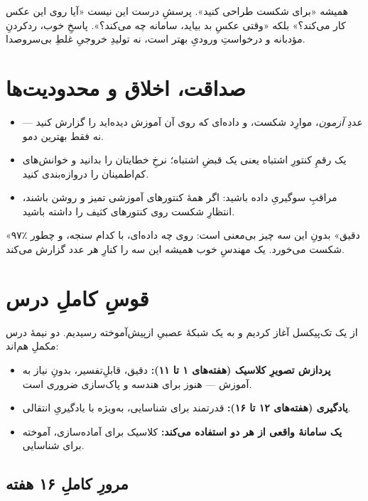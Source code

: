 \documentclass[12pt,a4paper]{article}
\begin{document}
\begin{hoshdar}
همیشه «برای شکست طراحی کنید». پرسشِ درست این نیست «آیا روی این عکس کار می‌کند؟» بلکه «وقتی عکسِ بد بیاید، سامانه چه می‌کند؟». پاسخِ خوب، رد‌کردنِ مؤدبانه و درخواستِ ورودیِ بهتر است، نه تولیدِ خروجیِ غلطِ بی‌سر‌و‌صدا.
\end{hoshdar}

\section{صداقت، اخلاق و محدودیت‌ها}

\begin{itemize}
  \item عددِ \emph{آزمون}، موارِد شکست، و داده‌ای که روی آن آموزش دیده‌اید را گزارش کنید — نه فقط بهترین دمو.
  \item یک رقمِ کنتورِ اشتباه یعنی یک قبضِ اشتباه؛ نرخِ خطایتان را بدانید و خوانش‌های کم‌اطمینان را دروازه‌بندی کنید.
  \item مراقبِ سوگیریِ داده باشید: اگر همهٔ کنتورهای آموزشی تمیز و روشن باشند، انتظارِ شکست روی کنتورهای کثیف را داشته باشید.
\end{itemize}

\begin{nokte}
«۹۷٪ دقیق» بدونِ این سه چیز بی‌معنی است: روی چه داده‌ای، با کدام سنجه، و چطور شکست می‌خورد. یک مهندسِ خوب همیشه این سه را کنارِ هر عدد گزارش می‌کند.
\end{nokte}

\section{قوسِ کاملِ درس}

از یک تک‌پیکسل آغاز کردیم و به یک شبکهٔ عصبیِ از‌پیش‌آموخته رسیدیم. دو نیمهٔ درس مکملِ هم‌اند:

\begin{itemize}
  \item \textbf{پردازش تصویرِ کلاسیک (هفته‌های ۱ تا ۱۱):} دقیق، قابلِ‌تفسیر، بدونِ نیاز به آموزش — هنوز برای هندسه و پاک‌سازی ضروری است.
  \item \textbf{یادگیری (هفته‌های ۱۲ تا ۱۶):} قدرتمند برای شناسایی، به‌ویژه با یادگیریِ انتقالی.
  \item \textbf{یک سامانهٔ واقعی از هر دو استفاده می‌کند:} کلاسیک برای آماده‌سازی، آموخته برای شناسایی.
\end{itemize}

\subsection{مرورِ کاملِ ۱۶ هفته}
\end{document}
